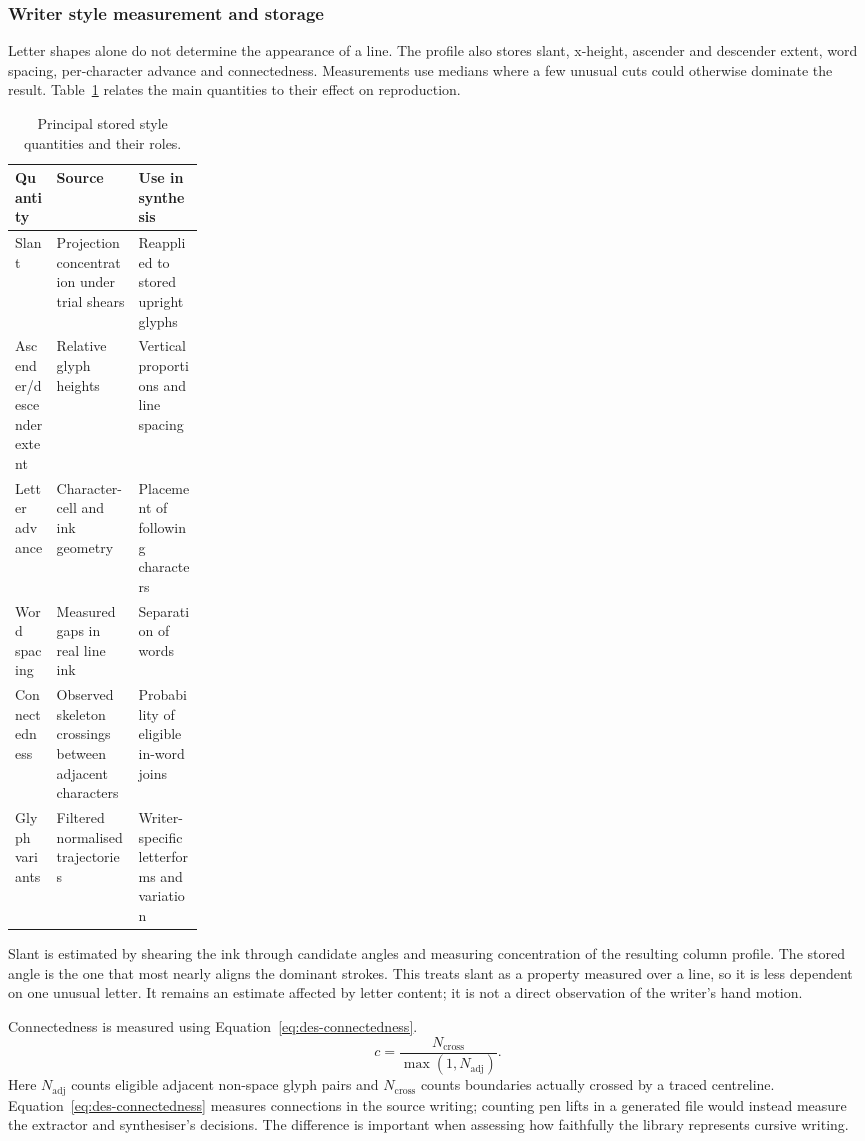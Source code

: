 \subsubsection{Writer style measurement and storage}
\label{sec:des-profile}
Letter shapes alone do not determine the appearance of a line. The profile also stores slant, x-height, ascender and descender extent, word spacing, per-character advance and connectedness. Measurements use medians where a few unusual cuts could otherwise dominate the result. Table~\ref{tab:des-styleparameters} relates the main quantities to their effect on reproduction.
\begin{table}[!htbp]\centering\small
\begin{tabularx}{\linewidth}{|p{0.22\linewidth}|X|X|}
\hline\textbf{Quantity}&\textbf{Source}&\textbf{Use in synthesis}\\\hline
Slant&Projection concentration under trial shears&Reapplied to stored upright glyphs\\\hline
Ascender/descender extent&Relative glyph heights&Vertical proportions and line spacing\\\hline
Letter advance&Character-cell and ink geometry&Placement of following characters\\\hline
Word spacing&Measured gaps in real line ink&Separation of words\\\hline
Connectedness&Observed skeleton crossings between adjacent characters&Probability of eligible in-word joins\\\hline
Glyph variants&Filtered normalised trajectories&Writer-specific letterforms and variation\\\hline
\end{tabularx}
\caption{Principal stored style quantities and their roles.}
\label{tab:des-styleparameters}
\end{table}

Slant is estimated by shearing the ink through candidate angles and measuring concentration of the resulting column profile. The stored angle is the one that most nearly aligns the dominant strokes. This treats slant as a property measured over a line, so it is less dependent on one unusual letter. It remains an estimate affected by letter content; it is not a direct observation of the writer's hand motion.

Connectedness is measured using Equation~\ref{eq:des-connectedness}.
\begin{equation}
c=\frac{N_{\mathrm{cross}}}{\max(1,N_{\mathrm{adj}})}.
\label{eq:des-connectedness}
\end{equation}
Here $N_{\mathrm{adj}}$ counts eligible adjacent non-space glyph pairs and $N_{\mathrm{cross}}$ counts boundaries actually crossed by a traced centreline. Equation~\ref{eq:des-connectedness} measures connections in the source writing; counting pen lifts in a generated file would instead measure the extractor and synthesiser's decisions. The difference is important when assessing how faithfully the library represents cursive writing.

